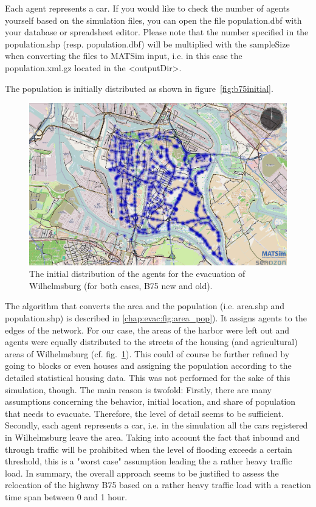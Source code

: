 Each agent represents a car. If you would like to check the number of agents yourself based on the simulation files, you can open the file population.dbf with your database or spreadsheet editor. Please note that the number specified in the population.shp (resp. population.dbf) will be multiplied with the sampleSize when converting the files to MATSim input, i.e. in this case the population.xml.gz located in the <outputDir>.

The population is initially distributed as shown in figure~\ref{fig:b75initial}. 

\begin{figure}[th!]
\centering
\includegraphics[width=0.7\linewidth]{extending/figures/Evacuation/B75initial}
\caption[Initial Distribution of Agents.]{The initial distribution of the agents for the evacuation of Wilhelmsburg (for both cases, B75 new and old).}
\label{fig:B75initial}
\end{figure}

The algorithm that converts the area and the population (i.e. area.shp and population.shp) is described in \ref{chap:evac:fig:area_pop}). It assigns agents to the edges of the network. For our case, the areas of the harbor were left out and agents were equally distributed to the streets of the housing (and agricultural) areas of Wilhelmsburg (cf. fig.~\ref{fig:B75initial}).
This could of course be further refined by going to blocks or even houses and assigning the population according to the detailed statistical housing data. This was not performed for the sake of this simulation, though. The main reason is twofold: Firstly, there are many assumptions concerning the behavior, initial location, and share of population that needs to evacuate. Therefore, the level of detail seems to be sufficient. Secondly, each agent represents a car, i.e. in the simulation all the cars registered in Wilhelmsburg leave the area. Taking into account the fact that inbound and through traffic will be prohibited when the level of flooding exceeds a certain threshold, this is a "worst case" assumption leading the a rather heavy traffic load. In summary, the overall approach seems to be justified to assess the relocation of the highway B75 based on a rather heavy traffic load with a reaction time span between 0 and 1 hour.

